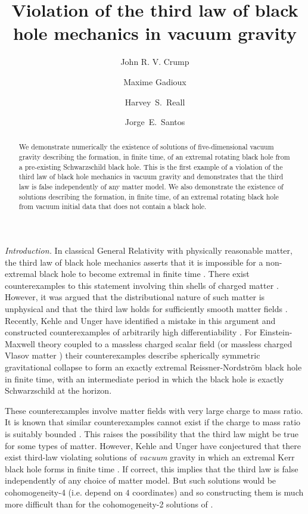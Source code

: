 \documentclass[prl,twocolumn,superscriptaddress,nofootinbib]{revtex4-2}
\begin{document}
\title{Violation of the third law of black hole mechanics in vacuum gravity}
\author{John R. V. Crump}
\author{Maxime Gadioux}
\author{Harvey~S.~Reall}
\author{Jorge~E.~Santos}

\begin{abstract}
We demonstrate numerically the existence of solutions of five-dimensional vacuum gravity describing the formation, in finite time, of an extremal rotating black hole from a pre-existing Schwarzschild black hole. This is the first example of a violation of the third law of black hole mechanics in vacuum gravity and demonstrates that the third law is false independently of any matter model.
We also demonstrate the existence of solutions describing the formation, in finite time, of an extremal rotating black hole from vacuum initial data that does not contain a black hole.

\end{abstract}

\maketitle

{\it Introduction.} In classical General Relativity with physically reasonable matter, the third law of black hole mechanics asserts that it is impossible for a non-extremal black hole to become extremal in finite time \cite{Bardeen:1973gs,Israel:1986gqz}. There exist counterexamples to this statement involving thin shells of charged matter \cite{shells}. However, it was argued that the distributional nature of such matter is unphysical and that the third law holds for sufficiently smooth matter fields \cite{Israel:1986gqz}. Recently, Kehle and Unger have identified a mistake in this argument and constructed counterexamples of arbitrarily high differentiability \cite{Kehle:2022uvc}. For Einstein-Maxwell theory coupled to a massless charged scalar field (or massless charged Vlasov matter \cite{Kehle:2024vyt}) their counterexamples describe spherically symmetric gravitational collapse to form an exactly extremal Reissner-Nordstr\"om black hole in finite time, with an intermediate period in which the black hole is exactly Schwarzschild at the horizon.

These counterexamples involve matter fields with very large charge to mass ratio. It is known that similar counterexamples cannot exist if the charge to mass ratio is suitably bounded \cite{Reall:2024njy}. This raises the possibility that the third law might be true for some types of matter. However, Kehle and Unger have conjectured that there exist third-law violating solutions of {\it vacuum} gravity in which an extremal Kerr black hole forms in finite time \cite{Kehle:2022uvc,Kehle:2023eni}. If correct, this implies that the third law is false independently of any choice of matter model. But such solutions would be cohomogeneity-4 (i.e. depend on $4$ coordinates) and so constructing them is much more difficult than for the cohomogeneity-2 solutions of \cite{Kehle:2022uvc}.
\end{document}

